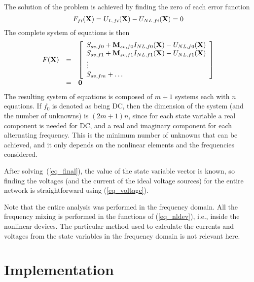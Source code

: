The solution of the problem is achieved by finding the zero of each
error function 
%
\begin{equation} 
  F_{fi}({\bf X}) = U_{L,fi}({\bf X}) - U_{NL,fi}({\bf X}) = 0 \label{eq_errfi}
\end{equation}
%
The complete system of equations is then
%
\begin{equation} 
  \begin{array}{ccl}
  F({\bf X}) & = & 
  \left[ \begin{array}{l}
  S_{sv,f0} + {\bf M}_{sv,f0} I_{NL,f0}({\bf X}) - U_{NL,f0}({\bf X}) \\
  S_{sv,f1} + {\bf M}_{sv,f1} I_{NL,f1}({\bf X}) - U_{NL,f1}({\bf X}) \\
  \vdots \\
  S_{sv,fm} + \dots \\
  \end{array} \right] \\
  & = & {\bf 0} 
  \end{array}  \label{eq_final}
\end{equation}
%
The resulting system of equations is composed of $m+1$ systems each
with $n$ equations. If $f_0$ is denoted as being DC, then the
dimension of the system (and the number of unknowns) is $(2m+1)n$,
since for each state variable a real component is needed for DC, and a
real and imaginary component for each alternating frequency. This is
the minimum number of unknowns that can be achieved, and it only
depends on the nonlinear elements and the frequencies considered.

After solving~(\ref{eq_final}), the value of the state variable vector
is known, so finding the voltages (and the current of the ideal
voltage sources) for the entire network is straightforward using
(\ref{eq_voltage}).

Note that the entire analysis was performed in the frequency
domain. All the frequency mixing is performed in the functions of
(\ref{eq_nldev}), i.e., inside the nonlinear devices.  The particular
method used to calculate the currents and voltages from the state
variables in the frequency domain is not relevant here.


\section{Implementation}

